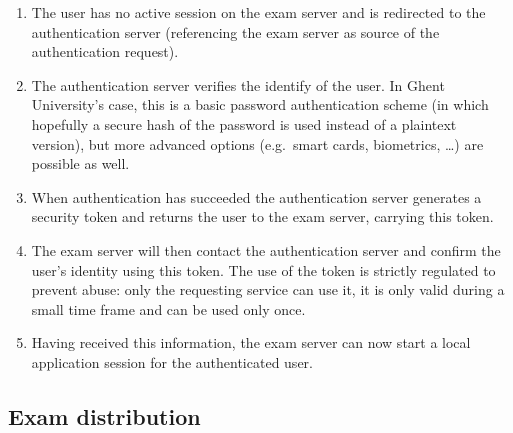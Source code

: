 \documentclass[12pt]{article}
\begin{document}
\begin{enumerate}

\item The user has no active session on the exam server and is redirected to the
authentication server (referencing the exam server as source of the
authentication request).

\item The authentication server verifies the identify of the user. In Ghent
University's case, this is a basic password authentication scheme (in which
hopefully a secure hash of the password is used instead of a plaintext version),
but more advanced options (e.g.\ smart cards, biometrics, \dots) are possible as
well.

\item When authentication has succeeded the authentication server generates a
security token and returns the user to the exam server, carrying this token.

\item The exam server will then contact the authentication server and confirm
the user's identity using this token. The use of the token is strictly regulated
to prevent abuse: only the requesting service can use it, it is only valid
during a small time frame and can be used only once.

\item Having received this information, the exam server can now start a local
application session for the authenticated user.

\end{enumerate}

\subsection{Exam distribution}
\label{subsec:impl-exams}


\end{document}
